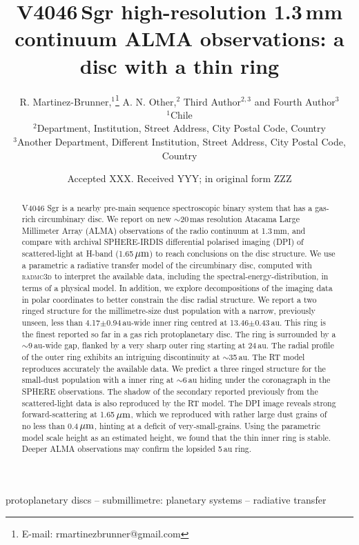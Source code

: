 \documentclass[letters, usenatbib]{mnras}
\title[V4046\,Sgr high-resolution ALMA observations]{V4046\,Sgr high-resolution 1.3\,mm continuum ALMA observations: a disc with a thin ring}
\author[R. Martinez Brunner et al.]{
R. Martinez-Brunner,$^{1}$\thanks{E-mail: rmartinezbrunner@gmail.com}
A. N. Other,$^{2}$
Third Author$^{2,3}$
and Fourth Author$^{3}$
\\
$^{1}$Chile\\
$^{2}$Department, Institution, Street Address, City Postal Code, Country\\
$^{3}$Another Department, Different Institution, Street Address, City Postal Code, Country
}
\date{Accepted XXX. Received YYY; in original form ZZZ}
\begin{document}
\label{firstpage}
\pagerange{\pageref{firstpage}--\pageref{lastpage}}
\maketitle

\begin{abstract}
    V4046 Sgr is a nearby pre-main sequence spectroscopic binary system that has a gas-rich circumbinary disc.
    We report on new $\sim20$\,mas resolution Atacama Large Millimeter Array (ALMA) observations of the radio continuum at 1.3\,mm, and compare with archival SPHERE-IRDIS differential polarised imaging (DPI) of scattered-light at H-band (1.65\,$\hbox{$\mu$m}$) to reach conclusions on the disc structure. 
    We use a parametric a radiative transfer model of the circumbinary disc, computed with \textsc{radmc3d} to interpret the available data, including the spectral-energy-distribution, in terms of a physical model. In addition, we explore decompositions of the imaging data in polar coordinates to better constrain the disc radial structure. 
    We report a two ringed structure for the millimetre-size dust population with a narrow, previously unseen, less than 4.17$\pm$0.94\,au-wide inner ring centred at 13.46$\pm$0.43\,au. This ring is the finest reported so far in a gas rich protoplanetary disc. The ring is surrounded by a $\sim$9\,au-wide gap, flanked by a very sharp outer ring starting at 24\,au. The radial profile of the outer ring exhibits an intriguing discontinuity at $\sim$35\,au. The RT model reproduces accurately the available data. We predict a three ringed structure for the small-dust population with a inner ring at $\sim$6\,au hiding under the coronagraph in the SPHERE observations. The shadow of the secondary reported previously from the scattered-light data is also reproduced by the RT model. 
    The DPI image reveals strong forward-scattering at 1.65\,$\hbox{$\mu$m}$, which we reproduced with rather large dust grains of no less than 0.4\,$\hbox{$\mu$m}$, hinting at a deficit of very-small-grains. Using the parametric model scale height as an estimated height, we found that the thin inner ring is stable. Deeper ALMA observations may confirm the lopsided 5\,au ring.
 
\end{abstract}

\begin{keywords}
 protoplanetary discs -- submillimetre: planetary systems -- radiative transfer
\end{keywords}
\end{document}
